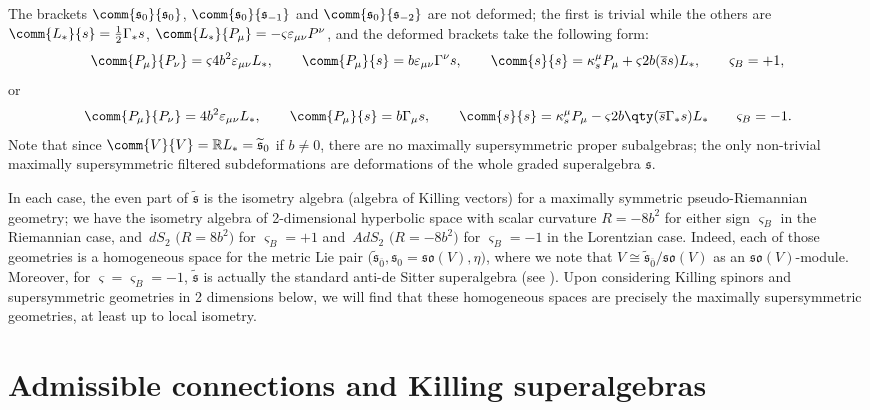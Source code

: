 \documentclass[pdftex]{sigma}
\numberwithin{equation}{section}
\newcommand{\fs}{\mathfrak{s}}
\newcommand{\fso}{\mathfrak{so}}
\newcommand{\RR}{\mathbb{R}}
\newcommand{\fstilde}{\widetilde{\fs}}
\newcommand{\1}{\mathbbm{1}}
\begin{document}
The brackets $\comm{\fs_0}{\fs_0}$, $\comm{\fs_0}{\fs_{-1}}$ and $\comm{\fs_0}{\fs_{-2}}$ are not deformed; the first is trivial while the others are
$\comm{L_*}{s} = \frac{1}{2}\Gamma_* s$,
$\comm{L_*}{P_\mu} = -\varsigma \varepsilon_{\mu\nu}P^\nu$,
and the deformed brackets take the following form:
\[%
	\comm{P_\mu}{P_\nu} = \varsigma 4b^2\varepsilon_{\mu\nu}L_*,	\qquad
	\comm{P_\mu}{s} = b\varepsilon_{\mu\nu}\Gamma^\nu s,	\qquad
	\comm{s}{s} = \kappa_s^\mu P_\mu + \varsigma 2b(\overline s s) L_*,	\qquad \varsigma_B=+1,
\]
or
\[%
	\comm{P_\mu}{P_\nu} = 4b^2\varepsilon_{\mu\nu}L_*,	\qquad
	\comm{P_\mu}{s} = b\Gamma_\mu s,	\qquad
	\comm{s}{s} = \kappa_s^\mu P_\mu - \varsigma 2b\qty(\overline s\Gamma_*s) L_*	\qquad \varsigma_B=-1.
\]
Note that since $\comm{V}{V}=\RR L_*=\fstilde_0$ if $b\neq 0$, there are no maximally supersymmetric proper subalgebras; the only non-trivial maximally supersymmetric filtered subdeformations are deformations of the whole graded superalgebra $\fs$.

In each case, the even part of $\fstilde$ is the isometry algebra (algebra of Killing vectors) for a maximally symmetric pseudo-Riemannian geometry; we have the isometry algebra of 2-dimensional hyperbolic space with scalar curvature $R=-8b^2$ for either sign $\varsigma_B$ in the Riemannian case, and~$dS_2$ $\bigl(R=8b^2\bigr)$ for $\varsigma_B=+1$ and~$AdS_2$ $\bigl(R=-8b^2\bigr)$ for $\varsigma_B=-1$ in the Lorentzian case. Indeed, each of those geometries is a homogeneous space for the metric Lie pair $\bigl(\fstilde_{\overline 0},\fs_0=\fso(V),\eta\bigr)$, where we note that $V\cong\fstilde_{\overline 0}/\fso(V)$ as an $\fso(V)$-module. Moreover, for $\varsigma=\varsigma_B=-1$, $\fstilde$ is actually the standard anti-de Sitter superalgebra (see \cite{VanProeyen1999}). Upon considering Killing spinors and supersymmetric geometries in 2 dimensions below, we will find that these homogeneous spaces are precisely the maximally supersymmetric geometries, at least up to local isometry.

\section{Admissible connections and Killing superalgebras}
\label{sec:2d-ksa}
\end{document}
